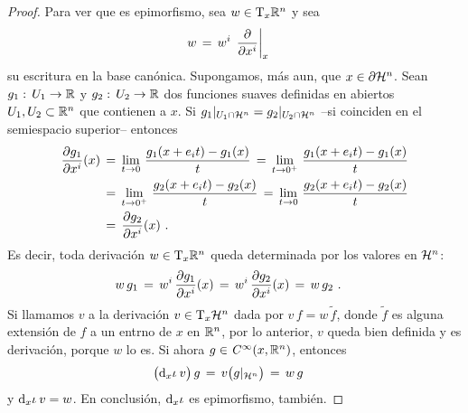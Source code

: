 \begin{proof}
	Para ver que es epimorfismo, sea $w\in\tangente[x]{\bb R^n}$ y sea
	\begin{align*}
		w & \,=\,w^i\,\gancho[x]{x^i}
	\end{align*}
	su escritura en la base can\'{o}nica. Supongamos, m\'{a}s aun, que
	$x\in\borde{\hemi[n]}$. Sean $g_1:\,U_1\rightarrow\bb R$ y
	$g_2:\,U_2\rightarrow\bb R$ dos funciones suaves definidas en
	abiertos $U_1,U_2\subset\bb R^n$ que contienen a $x$. Si
	$g_1|_{U_1\cap\hemi[n]}=g_2|_{U_2\cap\hemi[n]}$ --si coinciden en
	el semiespacio superior-- entonces
	\begin{align*}
		\derivada{g_1}{x^i}(x) & \,=\,\lim_{t\to0}\,
			\frac{g_1(x+e_it)-g_1(x)}{t} \,=\,
			\lim_{t\to0^+}\,\frac{g_1(x+e_it)-g_1(x)}{t} \\
		& \,=\,\lim_{t\to0^+}\,\frac{g_2(x+e_it)-g_2(x)}{t} \,=\,
			\lim_{t\to0}\,\frac{g_2(x+e_it)-g_2(x)}{t} \\
		& \,=\,\derivada{g_2}{x^i}(x)
		\text{ .}
	\end{align*}
	Es decir, toda derivaci\'{o}n $w\in\tangente[x]{\bb R^n}$ queda
	determinada por los valores en $\hemi[n]$:
	\begin{align*}
		w\,g_1 & \,=\,w^i\,\derivada{g_1}{x^i}(x)\,=\,
			w^i\,\derivada{g_2}{x^i}(x) \,=\,w\,g_2
		\text{ .}
	\end{align*}
	Si llamamos $v$ a la derivaci\'{o}n $v\in\tangente[x]{\hemi[n]}$ dada
	por $v\,f=w\,\tilde f$, donde $\tilde f$ es alguna extensi\'{o}n de $f$
	a un entrno de $x$ en $\bb R^n$, por lo anterior, $v$ queda bien
	definida y es derivaci\'{o}n, porque $w$ lo es. Si ahora
	$g\in\suaves{x,\bb R^n}$, entonces
	\begin{align*}
		\big(\diferencial[x]{\inc}\,v\big)\,g & \,=\,
			v\big(g|_{\hemi[n]}\big) \,=\,w\,g
	\end{align*}
	y $\diferencial[x]{\inc}\,v=w$. En conclusi\'{o}n,
	$\diferencial[x]{\inc}$ es epimorfismo, tambi\'{e}n.
\end{proof}

